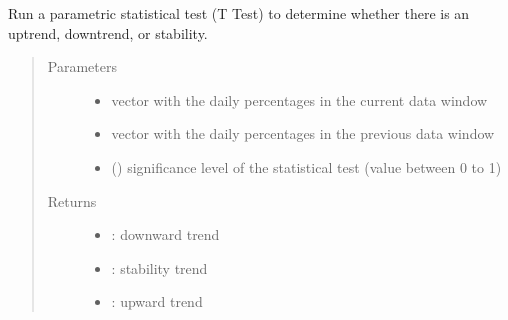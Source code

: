 \documentclass[letterpaper,10pt,english]{sphinxmanual}
\begin{document}

\begin{fulllineitems}
\label{\detokenize{algorithms:algorithms.eti.eti_utils.test_parametric}}
\sphinxAtStartPar
Run a parametric statistical test (T Test) to determine whether there is an uptrend, downtrend, or stability.
\begin{quote}\begin{description}
\item[{Parameters}] \leavevmode\begin{itemize}
\item {} 
\sphinxAtStartPar
{} \textendash{} vector with the daily percentages in the current data window

\item {} 
\sphinxAtStartPar
{} \textendash{} vector with the daily percentages in the previous data window

\item {} 
\sphinxAtStartPar
{} () \textendash{} significance level of the statistical test (value between 0 to 1)

\end{itemize}

\item[{Returns}] \leavevmode
\sphinxAtStartPar
\begin{itemize}
\item {} 
: downward trend

\item {} 
: stability trend

\item {} 
: upward trend

\end{itemize}


\end{description}\end{quote}

\end{fulllineitems}
\end{document}
